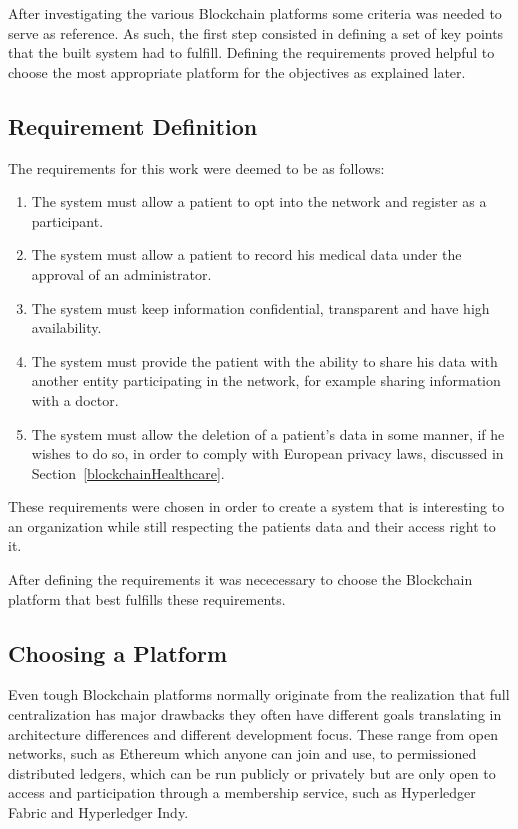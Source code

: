 After investigating the various Blockchain platforms some criteria was needed
to serve as reference. As such, the first step consisted in defining a set of
key points that the built system had to fulfill. Defining the requirements
proved helpful to choose the most appropriate platform for the objectives as
explained later.

\subsection{Requirement Definition} 
The requirements for this work were deemed to be as follows:

\renewcommand{\labelenumi}{\Roman{enumi}.}
\begin{enumerate}
  \item The system must allow a patient to opt into the network and register as
    a participant.
  \item The system must allow a patient to record his medical data under the
    approval of an administrator.
  \item The system must keep information confidential, transparent and have
    high availability.
  \item The system must provide the patient with the ability to share his data
    with another entity participating in the network, for example sharing
    information with a doctor.
  \item The system must allow the deletion of a patient's data in some manner,
    if he wishes to do so, in order to comply with European privacy laws,
    discussed in Section~\ref{blockchainHealthcare}.
\end{enumerate}

These requirements were chosen in order to create a system that is interesting
to an organization while still respecting the patients data and their access
right to it. 

After defining the requirements it was nececessary to choose the Blockchain
platform that best fulfills these requirements.

\subsection{Choosing a Platform}\label{choosePlatform}

Even tough Blockchain platforms normally originate from the realization that
full centralization has major drawbacks they often have different goals
translating in architecture differences and different development focus.  These
range from open networks, such as Ethereum which anyone can join and use, to
permissioned distributed ledgers, which can be run publicly or privately but
are only open to access and participation through a membership service, such as
Hyperledger Fabric and Hyperledger Indy.

